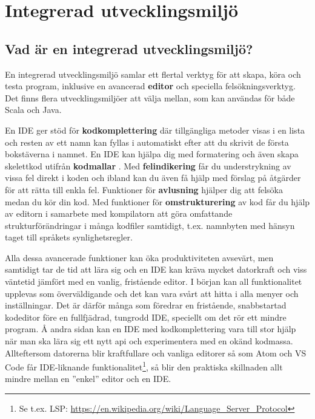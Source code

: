 
\chapter{Integrerad utvecklingsmiljö}\label{appendix:ide}

\section{Vad är en integrerad utvecklingsmiljö?}

En integrerad utvecklingsmiljö  samlar ett flertal verktyg för att skapa, köra och testa program, inklusive en avancerad \textbf{editor} och speciella felsökningsverktyg. %
 Det finns flera utvecklingsmiljöer att välja mellan, som kan användas för både Scala och Java.

En IDE ger stöd för \textbf{kodkomplettering}  där tillgängliga metoder visas i en lista och resten av ett namn kan fyllas i automatiskt efter att du skrivit de första bokstäverna i namnet. En IDE kan hjälpa dig med formatering och även skapa skelettkod utifrån \textbf{kodmallar} . Med \textbf{felindikering}  får du understrykning av vissa fel direkt i koden och ibland kan du även få hjälp med förslag på åtgärder för att rätta till enkla fel. Funktioner för \textbf{avlusning}  hjälper dig att felsöka medan du kör din kod. Med funktioner för \textbf{omstrukturering}  av kod får du hjälp av editorn i samarbete med kompilatorn att göra omfattande strukturförändringar i många kodfiler samtidigt, t.ex. namnbyten med hänsyn taget till språkets synlighetsregler.

Alla dessa avancerade funktioner kan öka produktiviteten avsevärt, men samtidigt tar de tid att lära sig och en IDE kan kräva mycket datorkraft och viss väntetid jämfört med en vanlig, fristående editor. I början kan all funktionalitet upplevas som överväldigande och det kan vara svårt att hitta i alla menyer och inställningar. Det är därför många som föredrar en fristående, snabbstartad kodeditor före en fullfjädrad, tungrodd IDE, speciellt om det rör ett mindre program. Å andra sidan kan en IDE med kodkomplettering vara till stor hjälp när man ska lära sig ett nytt api och experimentera med en okänd kodmassa. Allteftersom datorerna blir kraftfullare och vanliga editorer så som Atom och VS Code får IDE-liknande funktionalitet\footnote{Se t.ex. LSP: \url{https://en.wikipedia.org/wiki/Language_Server_Protocol}}, så blir den praktiska skillnaden allt mindre mellan en ''enkel'' editor och en IDE.

